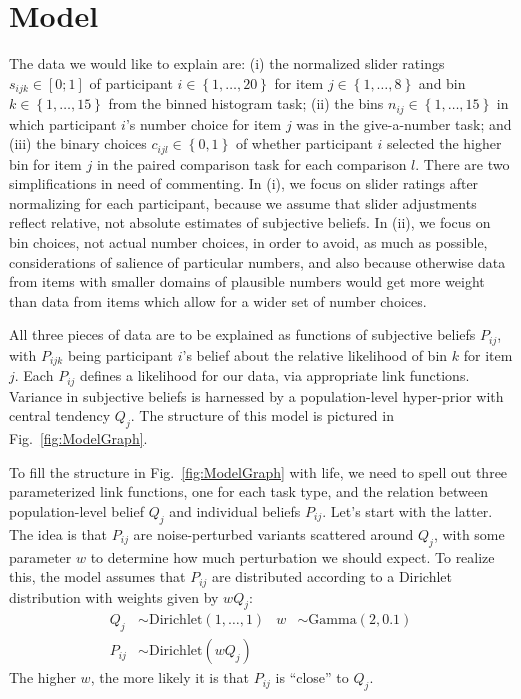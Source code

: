 \documentclass[10pt,letterpaper]{article}
\newcommand{\set}[1]{\left\{#1\right\}}
\newcommand{\figref}[1]{Fig.~\ref{#1}}
\begin{document}
\section{Model}

The data we would like to explain are: (i) the normalized slider ratings $s_{ijk} \in [0;1]$ of
participant $i \in \set{1, \dots, 20}$ for item $j \in \set{1, \dots, 8}$ and bin
$k \in \set{1, \dots, 15}$ from the binned histogram task; (ii) the bins $n_{ij} \in \set{1, \dots, 15}$ in which participant
$i$'s number choice for item $j$ was in the give-a-number task; and (iii) the binary choices $c_{ijl} \in \set{0,1}$ of
whether participant $i$ selected the higher bin for item $j$ in the paired comparison task for each comparison
$l$. There are two simplifications in need of commenting. In (i), we focus on slider ratings after
normalizing for each participant, because we assume that slider adjustments reflect relative, not
absolute estimates of subjective beliefs. In (ii), we focus on bin choices, not actual number
choices, in order to avoid, as much as possible, considerations of salience of particular
numbers, and also because otherwise data from items with smaller domains of plausible numbers
would get more weight than data from items which allow for a wider set of number choices.

All three pieces of data are to be explained as functions of subjective beliefs $P_{ij}$, with
$P_{ijk}$ being participant $i$'s belief about the relative likelihood of bin $k$ for item
$j$. Each $P_{ij}$ defines a likelihood for our data, via appropriate link functions. Variance
in subjective beliefs is harnessed by a population-level hyper-prior with central tendency
$Q_{j}$. The structure of this model is pictured in \figref{fig:ModelGraph}.



To fill the structure in \figref{fig:ModelGraph} with life, we need to spell out three
parameterized link functions, one for each task type, and the relation between population-level
belief $Q_j$ and individual beliefs $P_{ij}$. Let's start with the latter. The idea is that
$P_{ij}$ are noise-perturbed variants scattered around $Q_j$, with some parameter $w$ to
determine how much perturbation we should expect.  To realize this, the model assumes that
$P_{ij}$ are distributed according to a Dirichlet distribution with weights given by $w Q_{j}$:
\begin{align*}
  Q_j & \sim \text{Dirichlet}(1, \dots, 1) & w & \sim \text{Gamma}(2,0.1) \\
  P_{ij} & \sim \text{Dirichlet}( w Q_j)
\end{align*}
The higher $w$, the more likely it is that $P_{ij}$ is ``close'' to $Q_j$.
\end{document}
